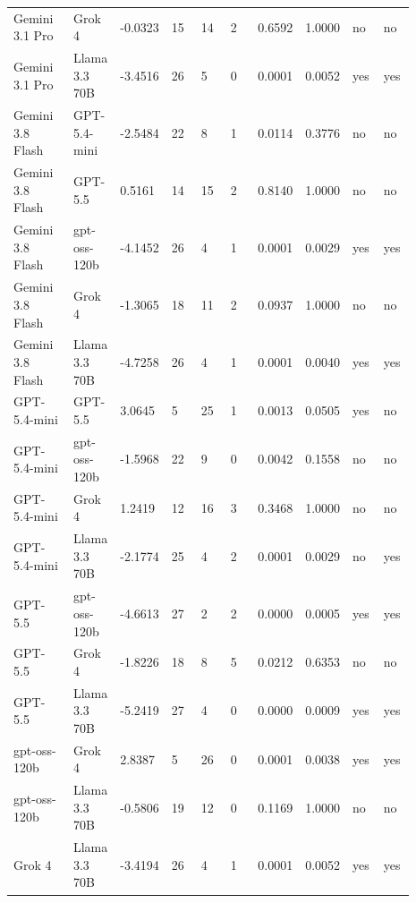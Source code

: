 \begin{landscape}
\begin{longtable}{p{0.162\linewidth}p{0.081\linewidth}p{0.081\linewidth}p{0.081\linewidth}p{0.081\linewidth}p{0.081\linewidth}p{0.081\linewidth}p{0.081\linewidth}p{0.081\linewidth}p{0.081\linewidth}}
Gemini 3.1 Pro & Grok 4 & -0.0323 & 15 & 14 & 2 & 0.6592 & 1.0000 & no & no \\
Gemini 3.1 Pro & Llama 3.3 70B & -3.4516 & 26 & 5 & 0 & 0.0001 & 0.0052 & yes & yes \\
Gemini 3.8 Flash & GPT-5.4-mini & -2.5484 & 22 & 8 & 1 & 0.0114 & 0.3776 & no & no \\
Gemini 3.8 Flash & GPT-5.5 & 0.5161 & 14 & 15 & 2 & 0.8140 & 1.0000 & no & no \\
Gemini 3.8 Flash & gpt-oss-120b & -4.1452 & 26 & 4 & 1 & 0.0001 & 0.0029 & yes & yes \\
Gemini 3.8 Flash & Grok 4 & -1.3065 & 18 & 11 & 2 & 0.0937 & 1.0000 & no & no \\
Gemini 3.8 Flash & Llama 3.3 70B & -4.7258 & 26 & 4 & 1 & 0.0001 & 0.0040 & yes & yes \\
GPT-5.4-mini & GPT-5.5 & 3.0645 & 5 & 25 & 1 & 0.0013 & 0.0505 & yes & no \\
GPT-5.4-mini & gpt-oss-120b & -1.5968 & 22 & 9 & 0 & 0.0042 & 0.1558 & no & no \\
GPT-5.4-mini & Grok 4 & 1.2419 & 12 & 16 & 3 & 0.3468 & 1.0000 & no & no \\
GPT-5.4-mini & Llama 3.3 70B & -2.1774 & 25 & 4 & 2 & 0.0001 & 0.0029 & no & yes \\
GPT-5.5 & gpt-oss-120b & -4.6613 & 27 & 2 & 2 & 0.0000 & 0.0005 & yes & yes \\
GPT-5.5 & Grok 4 & -1.8226 & 18 & 8 & 5 & 0.0212 & 0.6353 & no & no \\
GPT-5.5 & Llama 3.3 70B & -5.2419 & 27 & 4 & 0 & 0.0000 & 0.0009 & yes & yes \\
gpt-oss-120b & Grok 4 & 2.8387 & 5 & 26 & 0 & 0.0001 & 0.0038 & yes & yes \\
gpt-oss-120b & Llama 3.3 70B & -0.5806 & 19 & 12 & 0 & 0.1169 & 1.0000 & no & no \\
Grok 4 & Llama 3.3 70B & -3.4194 & 26 & 4 & 1 & 0.0001 & 0.0052 & yes & yes \\
\bottomrule
\end{longtable}
\normalsize
\end{landscape}
